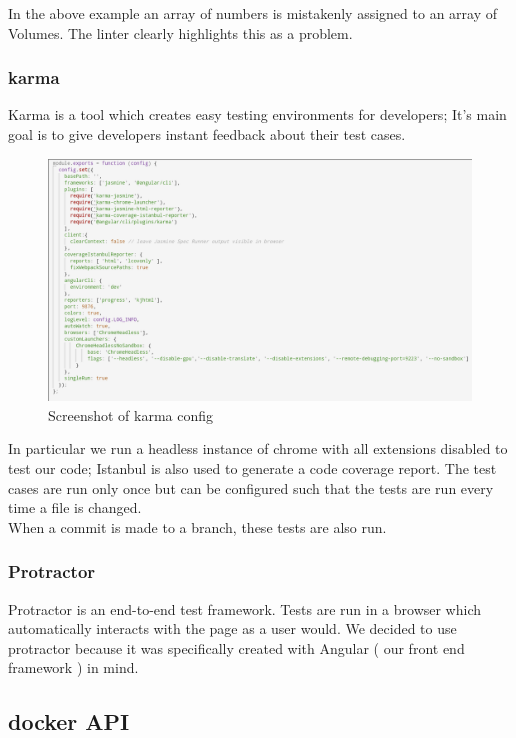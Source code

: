 \documentclass[]{article}
\begin{document}
In the above example an array of numbers is mistakenly assigned to an array of Volumes. 
The linter clearly highlights this as a problem.

\pagebreak

\subsubsection{karma}
Karma is a tool which creates easy testing environments for developers; It's main goal 
is to give developers instant feedback about their test cases.
\begin{figure}[H]
	\centering
	\includegraphics[scale=0.4]{karma.png}
	\caption{Screenshot of karma config}
\end{figure}

In particular we run a headless instance of chrome with all extensions
disabled to test our code; Istanbul is also used to generate a code coverage
report. The test cases are run only once but can be configured such that the tests
are run every time a file is changed.
\\
When a commit is made to a branch, these tests are also run.

\subsubsection{Protractor}
Protractor is an end-to-end test framework. Tests are run in a browser which automatically interacts
with the page as a user would. We decided to use protractor because it was specifically
created with Angular ( our front end framework ) in mind.

\subsection{docker API}
\end{document}
